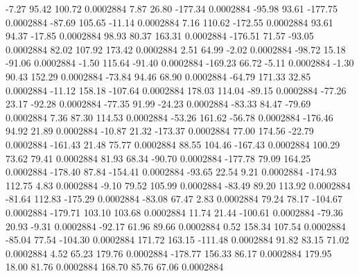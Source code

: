        -7.27       95.42      100.72     0.0002884
        7.87       26.80     -177.34     0.0002884
      -95.98       93.61     -177.75     0.0002884
      -87.69      105.65      -11.14     0.0002884
        7.16      110.62     -172.55     0.0002884
       93.61       94.37      -17.85     0.0002884
       98.93       80.37      163.31     0.0002884
     -176.51       71.57      -93.05     0.0002884
       82.02      107.92      173.42     0.0002884
        2.51       64.99       -2.02     0.0002884
      -98.72       15.18      -91.06     0.0002884
       -1.50      115.64      -91.40     0.0002884
     -169.23       66.72       -5.11     0.0002884
       -1.30       90.43      152.29     0.0002884
      -73.84       94.46       68.90     0.0002884
      -64.79      171.33       32.85     0.0002884
      -11.12      158.18     -107.64     0.0002884
      178.03      114.04      -89.15     0.0002884
      -77.26       23.17      -92.28     0.0002884
      -77.35       91.99      -24.23     0.0002884
      -83.33       84.47      -79.69     0.0002884
        7.36       87.30      114.53     0.0002884
      -53.26      161.62      -56.78     0.0002884
     -176.46       94.92       21.89     0.0002884
      -10.87       21.32     -173.37     0.0002884
       77.00      174.56      -22.79     0.0002884
     -161.43       21.48       75.77     0.0002884
       88.55      104.46     -167.43     0.0002884
      100.29       73.62       79.41     0.0002884
       81.93       68.34      -90.70     0.0002884
     -177.78       79.09      164.25     0.0002884
     -178.40       87.84     -154.41     0.0002884
      -93.65       22.54        9.21     0.0002884
     -174.93      112.75        4.83     0.0002884
       -9.10       79.52      105.99     0.0002884
      -83.49       89.20      113.92     0.0002884
      -81.64      112.83     -175.29     0.0002884
      -83.08       67.47        2.83     0.0002884
       79.24       78.17     -104.67     0.0002884
     -179.71      103.10      103.68     0.0002884
       11.74       21.44     -100.61     0.0002884
      -79.36       20.93       -9.31     0.0002884
      -92.17       61.96       89.66     0.0002884
        0.52      158.34      107.54     0.0002884
      -85.04       77.54     -104.30     0.0002884
      171.72      163.15     -111.48     0.0002884
       91.82       83.15       71.02     0.0002884
        4.52       65.23      179.76     0.0002884
     -178.77      156.33       86.17     0.0002884
      179.95       18.00       81.76     0.0002884
      168.70       85.76       67.06     0.0002884
